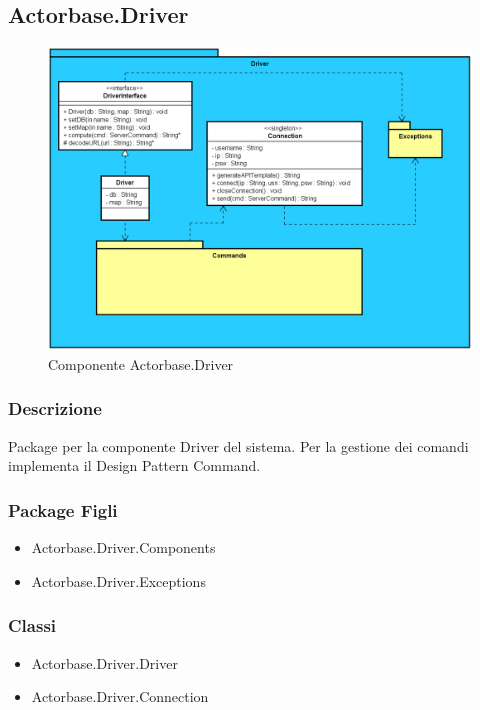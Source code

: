 \documentclass[a4paper]{article}
\begin{document}
					\subsection{Actorbase.Driver}
		\begin{figure} [H]
			\centering
			\includegraphics[scale=0.5]{ST/Client/DriverSemplificato.png}
        	\caption{Componente Actorbase.Driver}
		\end{figure}
		
		\subsubsection{Descrizione}
			Package per la componente Driver del sistema. Per la gestione dei comandi implementa il Design Pattern Command.
			
		\subsubsection{Package Figli}
			\begin{itemize}
				\item Actorbase.Driver.Components
				\item Actorbase.Driver.Exceptions
			\end{itemize}
			
		\subsubsection{Classi}
			\begin{itemize}
				\item Actorbase.Driver.Driver
				\item Actorbase.Driver.Connection
			\end{itemize}
			
\end{document}

